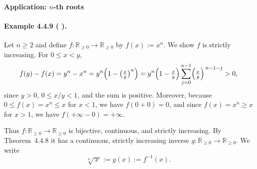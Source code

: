\documentclass[12pt]{article}
\newcommand{\R}{\mathbb{R}}
\newcommand{\NumberedExample}[3]{%
\paragraph*{Example #1 ( #2 ).} #3\par}
\begin{document}
\paragraph{Application: \texorpdfstring{$n$}{n}-th roots}
\NumberedExample{4.4.9}{}{Let $n\ge 2$ and define $f: \R_{\ge0}\to\R_{\ge0}$ by $f(x):=x^{n}$. We show $f$ is strictly increasing. For $0\le x<y$,
\[
	f(y)-f(x)=y^{n}-x^{n}=y^{n}\Bigl(1-\bigl(\tfrac{x}{y}\bigr)^{n}\Bigr)
	= y^{n}\Bigl(1-\tfrac{x}{y}\Bigr)\sum_{j=0}^{n-1} \Bigl(\tfrac{x}{y}\Bigr)^{\,n-1-j} > 0,
\]
since $y>0$, $0\le x/y<1$, and the sum is positive. Moreover, because $0\le f(x)=x^{n}\le x$ for $x<1$, we have $f(0+0)=0$, and since $f(x)=x^{n}\ge x$ for $x>1$, we have $f(+\infty-0)=+\infty$.

Thus $f:\R_{\ge0}\to\R_{\ge0}$ is bijective, continuous, and strictly increasing. By Theorem~4.4.8 it has a continuous, strictly increasing inverse $g: \R_{\ge0}\to\R_{\ge0}$. We write
\[
	\sqrt[n]{\,x\,} := g(x) := f^{-1}(x).
\]
}
\end{document}

